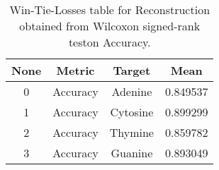 \begin{table}[H]
\centering
\begin{tabular}{|c|c|c|c|}

 \textbf{None} & \textbf{Metric} & \textbf{Target} &  \textbf{Mean} \\
\hline

             0 &        Accuracy &         Adenine &       0.849537 \\
\hline
             1 &        Accuracy &        Cytosine &       0.899299 \\
\hline
             2 &        Accuracy &         Thymine &       0.859782 \\
\hline
             3 &        Accuracy &         Guanine &       0.893049 \\
\hline

\end{tabular}
\caption{Win-Tie-Losses table for Reconstruction obtained from Wilcoxon signed-rank teston Accuracy.}
\label{tab:reconstruction_nucleotides_means}
\end{table}